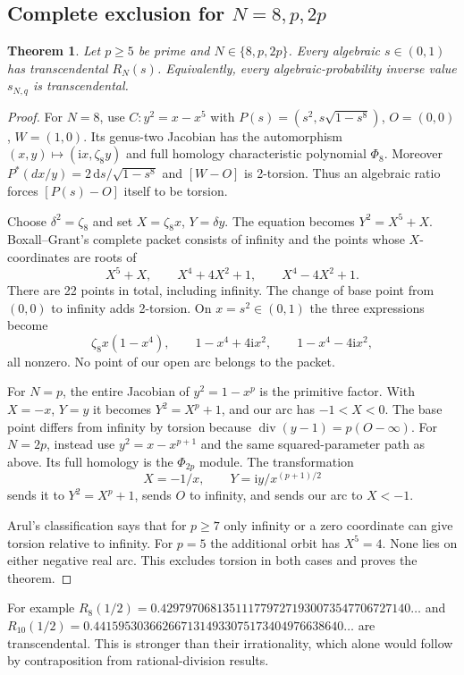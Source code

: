 \documentclass[11pt,a4paper]{article}
\numberwithin{equation}{section}
\newtheorem{theorem}{Theorem}[section]
\theoremstyle{definition}
\theoremstyle{remark}
\newcommand{\divisor}{\operatorname{div}}
\newcommand{\dd}{\,\mathrm d}
\newcommand{\ii}{\mathrm i}
\begin{document}
\subsection{Complete exclusion for \texorpdfstring{$N=8,p,2p$}{N = 8, p, 2p}}
\begin{theorem}\label{thm:special-ratios}
Let $p\ge5$ be prime and $N\in\{8,p,2p\}$. Every algebraic
$s\in(0,1)$ has transcendental $R_N(s)$. Equivalently, every
algebraic-probability inverse value $s_{N,q}$ is transcendental.
\end{theorem}
\begin{proof}
For $N=8$, use $C:y^2=x-x^5$ with
$P(s)=(s^2,s\sqrt{1-s^8})$, $O=(0,0)$, $W=(1,0)$. Its genus-two
Jacobian has the automorphism $(x,y)\mapsto(\ii x,\zeta_8y)$ and full
homology characteristic polynomial $\Phi_8$. Moreover
$P^*(dx/y)=2\dd s/\sqrt{1-s^8}$ and $[W-O]$ is 2-torsion.
Thus an algebraic ratio forces $[P(s)-O]$ itself to be torsion.

Choose $\delta^2=\zeta_8$ and set $X=\zeta_8x$, $Y=\delta y$.
The equation becomes $Y^2=X^5+X$. Boxall--Grant's complete packet
\cite[Theorem (0.3)]{BoxallGrant} consists of infinity and the points whose
$X$-coordinates are roots of
\[
 X^5+X,\qquad X^4+4X^2+1,\qquad X^4-4X^2+1.
\]
There are 22 points in total, including infinity. The change of base point
from $(0,0)$ to infinity adds 2-torsion. On $x=s^2\in(0,1)$ the three
expressions become
\[
 \zeta_8x(1-x^4),\qquad 1-x^4+4\ii x^2,\qquad1-x^4-4\ii x^2,
\]
all nonzero. No point of our open arc belongs to the packet.

For $N=p$, the entire Jacobian of $y^2=1-x^p$ is the primitive factor.
With $X=-x$, $Y=y$ it becomes $Y^2=X^p+1$, and our arc has $-1<X<0$.
The base point differs from infinity by torsion because
$\divisor(y-1)=p(O-\infty)$. For $N=2p$, instead use
$y^2=x-x^{p+1}$ and the same squared-parameter path as above. Its full
homology is the $\Phi_{2p}$ module. The transformation
\[
 X=-1/x,\qquad Y=\ii y/x^{(p+1)/2}
\]
sends it to $Y^2=X^p+1$, sends $O$ to infinity, and sends our arc to $X<-1$.

Arul's classification \cite[Theorem 6.2.21]{Arul} says that for $p\ge7$
only infinity or a zero coordinate can give torsion relative to infinity.
For $p=5$ the additional orbit has $X^5=4$. None lies on either negative
real arc. This excludes torsion in both cases and proves the theorem.
\end{proof}

For example $R_8(1/2)=0.4297970681351117797271930073547706727140\ldots$
and $R_{10}(1/2)=0.4415953036626671314933075173404976638640\ldots$
are transcendental. This is stronger than their irrationality, which alone
would follow by contraposition from rational-division results.
\end{document}
